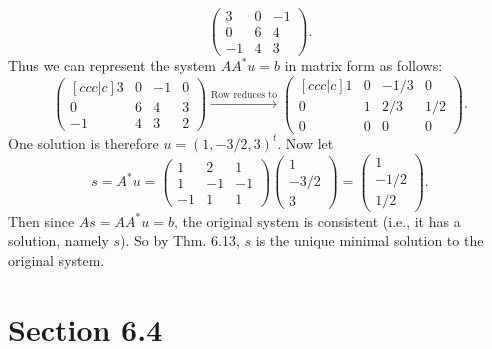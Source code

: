 \documentclass[12pt]{article}
\begin{document}
\begin{enumerate}
\begin{enumerate}
\begin{equation*}
\begin{pmatrix}
3 & 0 & -1 \\
0 & 6 & 4 \\
-1 & 4 & 3
\end{pmatrix}.
\end{equation*}
Thus we can represent the system $AA^*u = b$ in matrix form as follows:
\begin{equation*}
\begin{pmatrix}[ccc|c]
3 & 0 & -1 & 0 \\
0 & 6 & 4 & 3 \\
-1 & 4 & 3 & 2
\end{pmatrix}
\xrightarrow{\text{Row reduces to}}
\begin{pmatrix}[ccc|c]
1 & 0 & -1/3 & 0 \\
0 & 1 & 2/3 & 1/2 \\
0 & 0 & 0 & 0
\end{pmatrix}.
\end{equation*}
One solution is therefore $u = (1, -3/2, 3)^t$. Now let
\begin{equation*}
s = A^*u = \begin{pmatrix}
1 & 2 & 1 \\
1 & -1 & -1 \\
-1 & 1 & 1
\end{pmatrix}
\begin{pmatrix}
1 \\
-3/2 \\
3
\end{pmatrix}
= \begin{pmatrix}
1 \\
-1/2 \\
1/2
\end{pmatrix}.
\end{equation*}
Then since $As = AA^*u = b$, the original system is consistent (i.e., it has a solution, namely $s$). So by Thm. 6.13, $s$ is the unique minimal solution to the original system.

\end{enumerate}

\end{enumerate}

\iffalse
\section*{Section 6.4}
\end{document}
